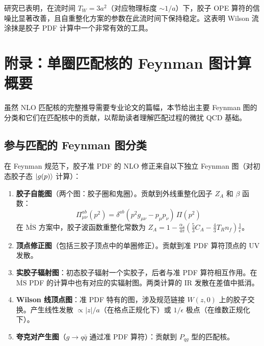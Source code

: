\documentclass[11pt,a4paper]{ctexart}
\begin{document}
研究已表明，在流时间 $T_W = 3a^2$（对应物理标度 $\sim 1/a$）下，胶子 OPE 算符的信噪比显著改善，且自重整化方案的参数在此流时间下保持稳定。这表明 Wilson 流涂抹是胶子 PDF 计算中一个非常有效的工具。

\section{附录：单圈匹配核的 Feynman 图计算概要}

虽然 NLO 匹配核的完整推导需要专业论文的篇幅，本节给出主要 Feynman 图的分类和它们在匹配核中的贡献，以帮助读者理解匹配过程的微扰 QCD 基础。

\subsection{参与匹配的 Feynman 图分类}

在 Feynman 规范下，胶子准 PDF 的 NLO 修正来自以下独立 Feynman 图（对初态胶子态 $\ket{g(p)}$ 计算）：

\begin{enumerate}
  \item \textbf{胶子自能图}（两个图：胶子圈和鬼圈）。贡献到外线重整化因子 $Z_A$ 和 $\beta$ 函数：
  \begin{equation}
  \Pi_{\mu\nu}^{ab}(p^2) = \delta^{ab} (p^2 g_{\mu\nu} - p_\mu p_\nu) \, \Pi(p^2)
  \end{equation}
  在 $\overline{\text{MS}}$ 方案中，胶子波函数重整化常数为 $Z_A = 1 - \frac{\alpha_s}{4\pi} \left( \frac{5}{3}C_A - \frac{4}{3}T_R n_f \right) \frac{1}{\epsilon}$。

  \item \textbf{顶点修正图}（包括三胶子顶点中的单圈修正）。贡献到准 PDF 算符顶点的 UV 发散。

  \item \textbf{实胶子辐射图}：初态胶子辐射一个实胶子，后者与准 PDF 算符相互作用。在 $\overline{\text{MS}}$ PDF 的计算中也有对应的实辐射图。两类计算的 IR 发散在差值中抵消。

  \item \textbf{Wilson 线顶点图}：准 PDF 特有的图，涉及规范链接 $W(z,0)$ 上的胶子交换。产生线性发散 $\propto |z|/a$（在格点正规化下）或 $1/\epsilon$ 极点（在维数正规化下）。

  \item \textbf{夸克对产生图}（$g \to q\bar{q}$ 通过准 PDF 算符）：贡献到 $P_{qg}$ 型的匹配核。
\end{enumerate}
\end{document}

